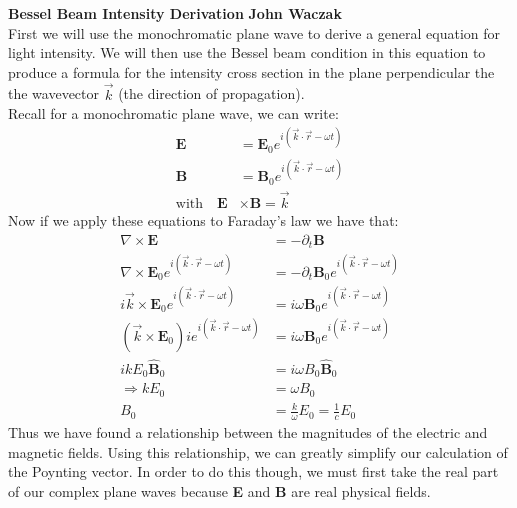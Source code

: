 \documentclass[a4paper, 11pt]{article}
\begin{document}
\noindent
\large\textbf{Bessel Beam Intensity Derivation} \hfill \textbf{John Waczak} \\

First we will use the monochromatic plane wave to derive a general equation for light intensity. We will then use the Bessel beam condition in this equation to produce a formula for the intensity cross section in the plane perpendicular the the wavevector $\vec{k}$ (the direction of propagation). \\ 

Recall for a monochromatic plane wave, we can write: 
	\begin{align*}
		\mathbf{E} &= \mathbf{E}_0e^{i(\vec{k}\cdot\vec{r}-\omega t)}\\
		\mathbf{B} &= \mathbf{B}_0e^{i(\vec{k}\cdot\vec{r}-\omega t)} \\
		\text{with} \quad \mathbf{E} &\times \mathbf{B} = \vec{k} 
	\end{align*}
Now if we apply these equations to Faraday's law we have that: 
	\begin{align*}
		\nabla \times \mathbf{E} &= -\partial_t\mathbf{B} \\ 
		\nabla \times \mathbf{E}_0e^{i(\vec{k}\cdot\vec{r}-\omega t)} &= -\partial_t \mathbf{B}_0e^{i(\vec{k}\cdot\vec{r}-\omega t)} \\ 
		i\vec{k}\times \mathbf{E}_0e^{i(\vec{k}\cdot\vec{r}-\omega t)} &= i\omega \mathbf{B}_0e^{i(\vec{k}\cdot\vec{r}-\omega t)} \\ 
		(\vec{k}\times \mathbf{E}_0)ie^{i(\vec{k}\cdot\vec{r}-\omega t)} &=i\omega \mathbf{B}_0e^{i(\vec{k}\cdot\vec{r}-\omega t)} \\ 
		ikE_0\hat{\mathbf{B}}_0 &= i\omega B_0 \hat{\mathbf{B}}_0 \\ 
		\Rightarrow kE_0 &= \omega B_0 \\ 
		B_0 &= \frac{k}{\omega}E_0 = \frac{1}{c}E_0
	\end{align*}
Thus we have found a relationship between the magnitudes of the electric and magnetic fields. Using this relationship, we can greatly simplify our calculation of the Poynting vector. In order to do this though, we must first take the real part of our complex plane waves because \textbf{E} and \textbf{B} are real physical fields. 
\end{document}
